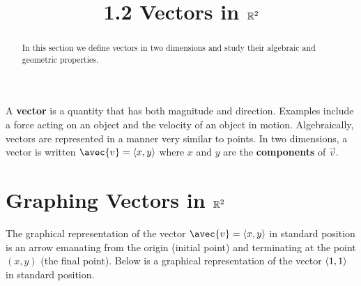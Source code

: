 \documentclass[handout]{ximera}
\title{1.2 Vectors in $\mathbb R^2$}
\begin{document}
\begin{abstract}
In this section we define vectors in two dimensions and study their algebraic and geometric properties.
\end{abstract}
 
\maketitle

A {\bf vector} is a quantity that has both magnitude and direction. Examples include a force acting on an object and the velocity of an object in motion.
Algebraically, vectors are represented in a manner very similar to points.  In two dimensions, a vector is written $\avec{v} = \vector{x,y}$  
where $x$ and $y$ are the {\bf components} of $\vec{v}$.


\section{Graphing Vectors in $\mathbb R^2$}
The graphical representation of the vector $\avec{v} = \vector{x,y}$ in standard position
is an arrow emanating from the origin (initial point) and terminating at the point $(x,y)$ (the final point).
Below is a graphical representation of the vector $\left\langle 1,1\right\rangle$ in standard position.

\begin{image}
\end{image}
\end{document}

